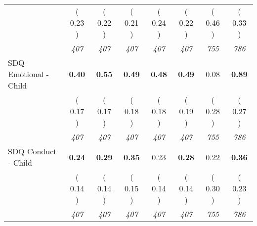 \begin{tabular}{l c c c c c c c}
& (     0.23 ) & (     0.22 ) & (     0.21 ) & (     0.24 ) & (     0.22 ) & (     0.46 ) & (     0.33 ) \\
& \textit{ 407 } & \textit{ 407 } & \textit{ 407 } & \textit{ 407 } & \textit{ 407 } & \textit{ 755 } & \textit{ 786 } \\
SDQ Emotional - Child & \textbf{      0.40 } & \textbf{      0.55 } & \textbf{      0.49 } & \textbf{     0.48} & \textbf{     0.49} &      0.08 & \textbf{      0.89 } \\
& (     0.17 ) & (     0.17 ) & (     0.18 ) & (     0.18 ) & (     0.19 ) & (     0.28 ) & (     0.27 ) \\
& \textit{ 407 } & \textit{ 407 } & \textit{ 407 } & \textit{ 407 } & \textit{ 407 } & \textit{ 755 } & \textit{ 786 } \\
SDQ Conduct - Child & \textbf{      0.24 } & \textbf{      0.29 } & \textbf{      0.35 } &      0.23 & \textbf{     0.28} &      0.22 & \textbf{      0.36 } \\
& (     0.14 ) & (     0.14 ) & (     0.15 ) & (     0.14 ) & (     0.14 ) & (     0.30 ) & (     0.23 ) \\
& \textit{ 407 } & \textit{ 407 } & \textit{ 407 } & \textit{ 407 } & \textit{ 407 } & \textit{ 755 } & \textit{ 786 } \\
\bottomrule
\end{tabular}
